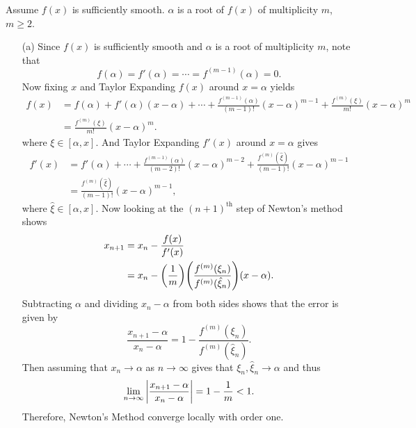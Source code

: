 \documentclass[12pt]{report}
\begin{document}
\begin{solution}

    \noindent
    Assume $f(x)$ is sufficiently smooth. $\alpha$ is a root of $f(x)$ of multiplicity $m$, $m \geq 2$.

    \begin{enumerate}
        \item [(a)]
        Since $f(x)$ is sufficiently smooth and $\alpha$ is a root of multiplicity $m$, note that
        \[ 
            f(\alpha) = f'(\alpha) = \cdots = f^{(m-1)}(\alpha) = 0.
        \]
        Now fixing $x$ and Taylor Expanding $f(x)$ around $x = \alpha$ yields
        \begin{align*}
            f(x) &= f(\alpha) + f'(\alpha)(x - \alpha) + \cdots + \frac{f^{(m-1)}(\alpha)}{(m-1)!}(x - \alpha)^{m-1} + \frac{f^{(m)}(\xi)}{m!}(x - \alpha)^m\\
            &= \frac{f^{(m)}(\xi)}{m!}(x - \alpha)^m.
        \end{align*} 
        where $\xi \in [\alpha,x]$. And Taylor Expanding $f'(x)$ around $x = \alpha$ gives
        \begin{align*}
            f'(x) &= f'(\alpha) + \cdots + \frac{f^{(m-1)}(\alpha)}{(m-2)!}(x - \alpha)^{m-2} + \frac{f^{(m)}(\hat{\xi})}{(m-1)!}(x-\alpha)^{m-1}\\
            &= \frac{f^{(m)}(\hat{\xi})}{(m-1)!}(x-\alpha)^{m-1},
        \end{align*}
        where $\hat{\xi} \in [\alpha,x]$. Now looking at the  $(n+1)^{\text{th}}$ step of Newton's method shows
        \begin{align*}
            x_{n+1}&= x_n - \frac{f(x)}{f'(x)}\\
            &= x_n - {\left(\frac{1}{m}\right)}{\left(\frac{f^{(m)}(\xi_n)}{f^{(m)}(\hat{\xi}_n)}\right)}(x - \alpha).
        \end{align*}
        Subtracting $\alpha$ and dividing $x_n - \alpha$ from both sides shows that the error is given by
        \[ 
            \frac{x_{n+1} - \alpha}{x_n - \alpha} = 1 - \frac{f^{(m)}(\xi_n)}{f^{(m)}(\hat{\xi}_n)}.
        \] 
        Then assuming that $x_n \to \alpha$ as $n \to \infty$ gives that $\xi_n, \hat{\xi}_n \to \alpha$ and thus
        \[ 
            \lim_{n \to \infty} {\left| \frac{x_{n+1} - \alpha}{x_n - \alpha}\right|} = 1 - \frac{1}{m} < 1.
        \]
        Therefore, Newton's Method converge locally with order one. 


\end{enumerate}
\end{solution}
\end{document}
